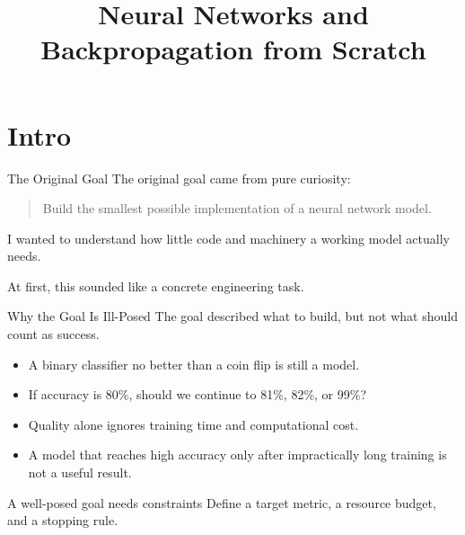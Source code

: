\documentclass[aspectratio=169]{beamer}
\title{Neural Networks and Backpropagation from Scratch}
\author{}
\date{}
\begin{document}
\begin{frame}[plain]
  \titlepage
\end{frame}

\section{Intro}

\begin{frame}{The Original Goal}
  The original goal came from pure curiosity:

  \begin{quote}
    Build the smallest possible implementation of a neural network model.
  \end{quote}

  I wanted to understand how little code and machinery a working model
  actually needs.

  At first, this sounded like a concrete engineering task.
\end{frame}

\begin{frame}{Why the Goal Is Ill-Posed}
  The goal described what to build, but not what should count as success.

  \begin{itemize}
    \item A binary classifier no better than a coin flip is still a model.
    \item If accuracy is 80\%, should we continue to 81\%, 82\%, or 99\%?
    \item Quality alone ignores training time and computational cost.
    \item A model that reaches high accuracy only after impractically long
      training is not a useful result.
  \end{itemize}

  \begin{block}{A well-posed goal needs constraints}
    Define a target metric, a resource budget, and a stopping rule.
  \end{block}
\end{frame}
\end{document}

